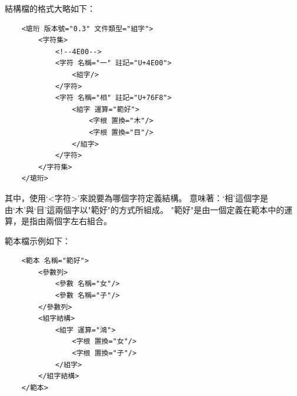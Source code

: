 結構檔的格式大略如下：
\listXML\begin{lstlisting}
	<瑲珩 版本號="0.3" 文件類型="組字">
		<字符集>
			<!--4E00-->
			<字符 名稱="一" 註記="U+4E00">
				<組字/>
			</字符>
			<字符 名稱="相" 註記="U+76F8">
				<組字 運算="範好">
					<字根 置換="木"/>
					<字根 置換="目"/>
				</組字>
			</字符>
		</字符集>
	</瑲珩>
\end{lstlisting}

其中，使用`<字符>'來說要為哪個字符定義結構。
意味著：`相'這個字是由`木'與`目'這兩個字以"範好"的方式所組成。
"範好"是由一個定義在範本中的運算，是指由兩個字左右組合。

範本檔示例如下：
\listXML\begin{lstlisting}
	<範本 名稱="範好">
		<參數列>
			<參數 名稱="女"/>
			<參數 名稱="子"/>
		</參數列>
		<組字結構>
			<組字 運算="鴻">
				<字根 置換="女"/>
				<字根 置換="子"/>
			</組字>
		</組字結構>
	</範本>
\end{lstlisting}


